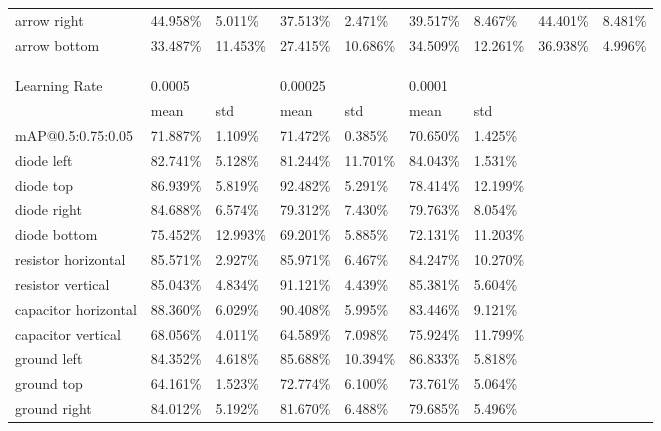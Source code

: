 \begin{table}[H]
\begin{center}
\begin{tabular}{|l|l|l|l|l|l|l|l|l|}
arrow right                     & 44.958\% & 5.011\%  & 37.513\% & 2.471\%  & 39.517\% & 8.467\%  & 44.401\% & 8.481\%   \\
\rowcolor{lightgray!50}
arrow bottom                    & 33.487\% & 11.453\% & 27.415\% & 10.686\% & 34.509\% & 12.261\% & 36.938\% & 4.996\%   \\
\hline
\\\\\\
\hline
Learning Rate                   & 0.0005   &          & 0.00025  &          & 0.0001   &           & & \\
\hline
                                & mean     & std      & mean     & std      & mean     & std       & & \\
\hline
mAP@0.5:0.75:0.05               & 71.887\% & 1.109\%  & 71.472\% & 0.385\%  &  70.650\% & 1.425\%  & & \\
\hline
\rowcolor{lightgray!50}
diode left                      & 82.741\% & 5.128\%  & 81.244\% & 11.701\% &  84.043\% & 1.531\%  & & \\
diode top                       & 86.939\% & 5.819\%  & 92.482\% & 5.291\%  &  78.414\% & 12.199\% & & \\
\rowcolor{lightgray!50}
diode right                     & 84.688\% & 6.574\%  & 79.312\% & 7.430\%  &  79.763\% & 8.054\%  & & \\
diode bottom                    & 75.452\% & 12.993\% & 69.201\% & 5.885\%  &  72.131\% & 11.203\% & & \\
\rowcolor{lightgray!50}
resistor horizontal             & 85.571\% & 2.927\%  & 85.971\% & 6.467\%  &  84.247\% & 10.270\% & & \\
resistor vertical               & 85.043\% & 4.834\%  & 91.121\% & 4.439\%  &  85.381\% & 5.604\%  & & \\
\rowcolor{lightgray!50}
capacitor horizontal            & 88.360\% & 6.029\%  & 90.408\% & 5.995\%  &  83.446\% & 9.121\%  & & \\
capacitor vertical              & 68.056\% & 4.011\%  & 64.589\% & 7.098\%  &  75.924\% & 11.799\% & & \\
\rowcolor{lightgray!50}
ground left                     & 84.352\% & 4.618\%  & 85.688\% & 10.394\% &  86.833\% & 5.818\%  & & \\
ground top                      & 64.161\% & 1.523\%  & 72.774\% & 6.100\%  &  73.761\% & 5.064\%  & & \\
\rowcolor{lightgray!50}
ground right                    & 84.012\% & 5.192\%  & 81.670\% & 6.488\%  &  79.685\% & 5.496\%  & & \\

\end{tabular}
\end{center}
\end{table}
